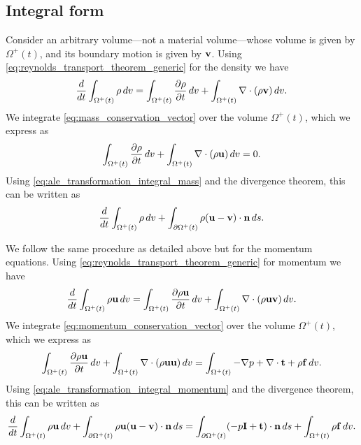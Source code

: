 \documentclass[oneside,a4paper,11pt]{report}
\begin{document}
\subsection{Integral form} 
Consider an arbitrary volume---not a material volume---whose volume is given by $\Omega^+(t)$, and its boundary motion is given by $\mathbf{v}$. Using \cref{eq:reynolds_transport_theorem_generic} for the density we have
\begin{equation}
\label{eq:ale_transformation_integral_mass}
    \frac{d}{dt} \int_{\Omega^+(t)} \rho \, dv = \int_{\Omega^+(t)} \frac{\partial \rho}{\partial t} \, dv + \int_{\Omega^+(t)} \nabla \cdot (\rho \mathbf{v}) \, dv.
\end{equation}
We integrate \cref{eq:mass_conservation_vector} over the volume $\Omega^+(t)$, which we express as
\begin{equation}
    \int_{\Omega^+(t)} \frac{\partial \rho}{\partial t} \, dv + \int_{\Omega^+(t)} \nabla \cdot (\rho \mathbf{u}) \, dv = 0.
\end{equation}
Using \cref{eq:ale_transformation_integral_mass} and the divergence theorem, this can be written as
\begin{equation}
    \frac{d}{dt} \int_{\Omega^+(t)} \rho \, dv + \int_{\partial \Omega^+(t)} \rho (\mathbf{u} - \mathbf{v}) \cdot \mathbf{n} \, ds.
\end{equation}

We follow the same procedure as detailed above but for the momentum equations. Using \cref{eq:reynolds_transport_theorem_generic} for momentum we have
\begin{equation}
\label{eq:ale_transformation_integral_momentum}
    \frac{d}{dt} \int_{\Omega^+(t)} \rho \mathbf{u} \, dv = \int_{\Omega^+(t)} \frac{\partial \rho \mathbf{u}}{\partial t} \, dv + \int_{\Omega^+(t)} \nabla \cdot (\rho \mathbf{u} \mathbf{v}) \, dv.
\end{equation}
We integrate \cref{eq:momentum_conservation_vector} over the volume $\Omega^+(t)$, which we express as
\begin{equation}
    \int_{\Omega^+(t)} \frac{\partial \rho \mathbf{u}}{\partial t} \, dv + \int_{\Omega^+(t)} \nabla \cdot (\rho \mathbf{u} \mathbf{u}) \, dv = \int_{\Omega^+(t)} -\nabla p + \nabla \cdot \mathbf{t} + \rho \mathbf{f} \, dv.
\end{equation}
Using \cref{eq:ale_transformation_integral_momentum} and the divergence theorem, this can be written as
\begin{equation}
    \frac{d}{dt} \int_{\Omega^+(t)}  \rho \mathbf{u} \, dv + \int_{\partial \Omega^+(t)} \rho \mathbf{u} (\mathbf{u} - \mathbf{v}) \cdot \mathbf{n} \, ds = \int_{\partial \Omega^+(t)} (- p \mathbf{I} + \mathbf{t}) \cdot \mathbf{n} \, ds + \int_{\Omega^+(t)} \rho \mathbf{f} \, dv.
\end{equation}
\end{document}
